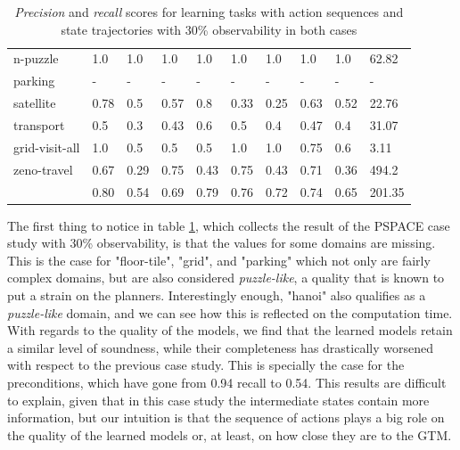 \begin{table}[hbt!]
\begin{center}
\begin{tabular}{l|l|l|l|l|l|l||l|l|l|}
			n-puzzle & 1.0 & 1.0 & 1.0 & 1.0 & 1.0 & 1.0 & 1.0 & 1.0& 62.82 \\ %
			parking & - & - & - & - & - & - & - & - & - \\ %
			satellite & 0.78 & 0.5 & 0.57 & 0.8 & 0.33 & 0.25 & 0.63 & 0.52& 22.76 \\ %
			transport & 0.5 & 0.3 & 0.43 & 0.6 & 0.5 & 0.4 & 0.47 & 0.4& 31.07 \\ %
			grid-visit-all & 1.0 & 0.5 & 0.5 & 0.5 & 1.0 & 1.0 & 0.75 & 0.6& 3.11 \\ %
			zeno-travel & 0.67 & 0.29 & 0.75 & 0.43 & 0.75 & 0.43 & 0.71 & 0.36& 494.2 \\ %
			\hline
			\bf & 0.80 & 0.54 & 0.69 & 0.79 & 0.76 & 0.72 & 0.74 & 0.65 & 201.35 
			
		\end{tabular}
		
	\end{center}
	\caption{\small {\em Precision} and {\em recall} scores for learning tasks with \PO action sequences and \PO state trajectories with 30\% observability in both cases}
	\label{tab:results_minimum_30_30}
\end{table}

The first thing to notice in table \ref{tab:results_minimum_30_30}, which collects the result of the PSPACE case study with 30\% observability, is that the values for some domains are missing. This is the case for "floor-tile", "grid", and "parking" which not only are fairly complex domains, but are also considered \emph{puzzle-like}, a quality that is known to put a strain on the planners. Interestingly enough, "hanoi" also qualifies as a \emph{puzzle-like} domain, and we can see how this is reflected on the computation time. With regards to the quality of the models, we find that the learned models retain a similar level of soundness, while their completeness has drastically worsened with respect to the previous case study. This is specially the case for the preconditions, which have gone from 0.94 recall to 0.54. This results are difficult to explain, given that in this case study the intermediate states contain more information, but our intuition is that the sequence of actions plays a big role on the quality of the learned models or, at least, on how close they are to the GTM.

